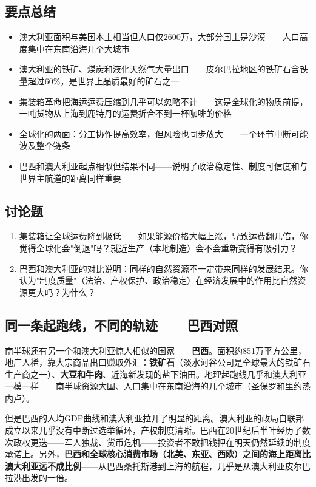 \documentclass[a4paper,12pt]{ctexart}
\begin{document}
\subsection*{要点总结}
\begin{itemize}
  \item 澳大利亚面积与美国本土相当但人口仅2600万，大部分国土是沙漠——人口高度集中在东南沿海几个大城市
  \item 澳大利亚的铁矿、煤炭和液化天然气大量出口——皮尔巴拉地区的铁矿石含铁量超过60\%，是世界上品质最好的矿石之一
  \item 集装箱革命把海运运费压缩到几乎可以忽略不计——这是全球化的物质前提，一吨货物从上海到鹿特丹的运费折合不到一杯咖啡的价格
  \item 全球化的两面：分工协作提高效率，但风险也同步放大——一个环节中断可能波及整个链条
  \item 巴西和澳大利亚起点相似但结果不同——说明了政治稳定性、制度可信度和与世界主航道的距离同样重要
\end{itemize}

\subsection*{讨论题}
\begin{enumerate}
  \item 集装箱让全球运费降到极低——如果能源价格大幅上涨，导致运费翻几倍，你觉得全球化会"倒退"吗？就近生产（本地制造）会不会重新变得有吸引力？
  \item 巴西和澳大利亚的对比说明：同样的自然资源不一定带来同样的发展结果。你认为"制度质量"（法治、产权保护、政治稳定）在经济发展中的作用比自然资源更大吗？为什么？
\end{enumerate}

\subsection*{同一条起跑线，不同的轨迹——巴西对照}

南半球还有另一个和澳大利亚惊人相似的国家——\textbf{巴西}。面积约851万平方公里，地广人稀，靠大宗商品出口赚取外汇：\textbf{铁矿石}（淡水河谷公司是全球最大的铁矿石生产商之一）、\textbf{大豆和牛肉}、近海新发现的盐下油田。地理起跑线几乎和澳大利亚一模一样——南半球资源大国、人口集中在东南沿海的几个城市（圣保罗和里约热内卢）。

但是巴西的人均GDP曲线和澳大利亚拉开了明显的距离。澳大利亚的政局自联邦成立以来几乎没有中断过选举循环，产权制度清晰。巴西在20世纪后半叶经历了数次政权更迭——军人独裁、货币危机——投资者不敢把钱押在明天仍然延续的制度承诺上。另外，\textbf{巴西和全球核心消费市场（北美、东亚、西欧）之间的海上距离比澳大利亚远不成比例}——从巴西桑托斯港到上海的航程，几乎是从澳大利亚皮尔巴拉港出发的一倍。
\end{document}
